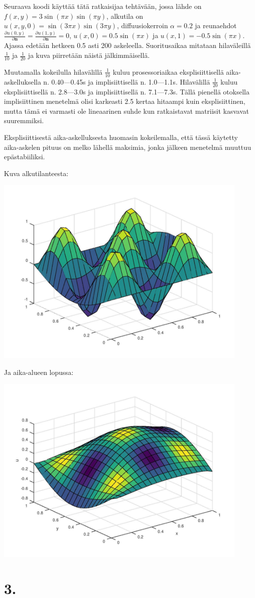 \documentclass{article}
\begin{document}
Seuraava koodi käyttää tätä ratkaisijaa tehtävään, jossa lähde on $f(x,y) =
3\sin(\pi x)\sin(\pi y)$, alkutila on $u(x,y,0) = \sin(3\pi x)\sin(3\pi y)$,
diffuusiokerroin $\alpha = 0.2$ ja reunaehdot $\frac{\partial u(0,y)}{\partial
\mathbf{n}} = \frac{\partial u(1,y)}{\partial \mathbf{n}} = 0$, $u(x,0) =
0.5\sin(\pi x)$ ja $u(x,1) = -0.5\sin(\pi x)$.  Ajassa edetään hetkeen 0.5 asti
200 askeleella.  Suoritusaikaa mitataan hilaväleillä $\frac{1}{10}$ ja
$\frac{1}{20}$ ja kuva piirretään näistä jälkimmäisellä.



Muutamalla kokeilulla hilavälillä $\frac{1}{10}$ kuluu prosessoriaikaa
eksplisiittisellä aika-askelluksella n. 0.40—0.45s ja implisiittisellä n.
1.0—1.1s.  Hilavälillä $\frac{1}{20}$ kuluu eksplisiittisellä n. 2.8—3.0s ja
implisiittisellä n. 7.1—7.3s.
Tällä pienellä otoksella implisiittinen menetelmä olisi karkeasti 2.5 kertaa hitaampi
kuin eksplisiittinen, mutta tämä ei varmasti ole lineaarinen suhde kun ratkaistavat
matriisit kasvavat suuremmiksi.

Eksplisiittisestä aika-askelluksesta huomasin kokeilemalla, että tässä käytetty
aika-askelen pituus on melko lähellä maksimia, jonka jälkeen menetelmä muuttuu
epästabiiliksi.

Kuva alkutilanteesta:

\includegraphics[width=350pt]{w4_2_start.jpg}

Ja aika-alueen lopussa:

\includegraphics[width=350pt]{w4_2_end.jpg}

\newpage

\section*{3.}
\end{document}
